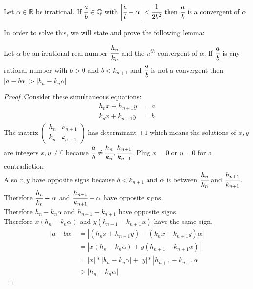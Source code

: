 \documentclass[11pt]{article}
\begin{document}
\begin{theorem}
	Let $\alpha \in \mathbb{R}$ be irrational. If $\cfrac{a}{b} \in \mathbb{Q} $ with $\bigg |\cfrac{a}{b} - \alpha \bigg| < \cfrac{1}{2b^2}$ then $\cfrac{a}{b}$ is a convergent of $\alpha$  
\end{theorem}
In order to solve this, we will state and prove the following lemma:

\begin{lemma}
	Let $\alpha$ be an irrational real number $\cfrac{h_n}{k_n}$ and the $n^{th}$ convergent of $\alpha$. If $\cfrac{a}{b}$ is any rational number with $b>0$ and $b<k_{n+1}$ and $\cfrac{a}{b}$ is not a convergent then $|a-b\alpha| > |h_n-k_n\alpha|$
\end{lemma}

\begin{proof}
Consider these simultaneous equations:
	\begin{align*}
		h_nx+h_{n+1}y&=a\\
		k_nx+k_{n+1}y&=b
	\end{align*}
	The matrix
	$
	\begin{pmatrix}
		h_n & h_{n+1} \\ k_n & k_{n+1} 
	\end{pmatrix}$
	has determinant $\pm 1$ which means the solutions of $x,y$ are integers $x,y\neq 0$ because $\cfrac{a}{b} \neq \cfrac{h_n}{k_n}, \cfrac{h_{n+1}}{k_{n+1}}$. Plug $x=0$ or $y=0$ for a contradiction.\\[1em]
	Also $x,y$ have opposite signs because $b<k_{n+1}$ and $\alpha $ is between $\cfrac{h_n}{k_n}$ and $\cfrac{h_{n+1}}{k_{n+1}}$. \\[1em]
	Therefore $\cfrac{h_n}{k_n} - \alpha$ and $\cfrac{h_{n+1}}{k_{n+1}}-\alpha$ have opposite signs.\\[1em]
	Therefore $h_n-k_n\alpha$ and $h_{n+1}-k_{n+1}$ have opposite signs.\\[1em]
	Therefore $x(h_n-k_n\alpha)$ and $y(h_{n+1}-k_{n+1}\alpha)$ have the same sign.
	\begin{align*}
		| a-b\alpha| & = |(h_nx+h_{n+1}y)-(k_nx+k_{n+1}y)\alpha|\\
		&=| x(h_n-k_n\alpha) + y(h_{n+1}-k_{n+1}\alpha)|\\
		&=|x| * |h_n-k_n\alpha| + |y|*|h_{n+1}-k_{n+1}\alpha|\\
		&> |h_n-k_n\alpha|
	\end{align*}


\end{proof}
\end{document}
